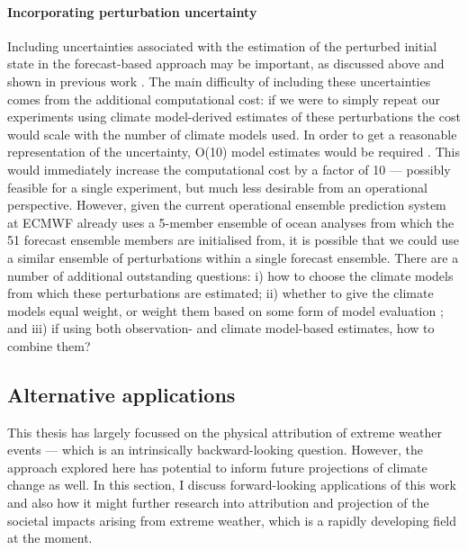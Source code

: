     \paragraph*{Incorporating perturbation uncertainty}

      Including uncertainties associated with the estimation of the perturbed initial state in the forecast-based approach may be important, as discussed above and shown in previous work \citep{pall_anthropogenic_2011,sparrow_attributing_2018}. The main difficulty of including these uncertainties comes from the additional computational cost: if we were to simply repeat our experiments using climate model-derived estimates of these perturbations the cost would scale with the number of climate models used. In order to get a reasonable representation of the uncertainty, O(10) model estimates would be required \citep[as in][]{sparrow_attributing_2018}. This would immediately increase the computational cost by a factor of 10 --- possibly feasible for a single experiment, but much less desirable from an operational perspective. However, given the current operational ensemble prediction system at ECMWF already uses a 5-member ensemble of ocean analyses from which the 51 forecast ensemble members are initialised from, it is possible that we could use a similar ensemble of perturbations within a single forecast ensemble. There are a number of additional outstanding questions: i) how to choose the climate models from which these perturbations are estimated; ii) whether to give the climate models equal weight, or weight them based on some form of model evaluation \citep[this is especially relevant for the latest generation of climate models, the CMIP6 ensemble,][]{eyring_overview_2016,hausfather_climate_2022}; and iii) if using both observation- and climate model-based estimates, how to combine them?

  \subsection{Alternative applications}

    This thesis has largely focussed on the physical attribution of extreme weather events --- which is an intrinsically backward-looking question. However, the approach explored here has potential to inform future projections of climate change as well. In this section, I discuss forward-looking applications of this work and also how it might further research into attribution and projection of the societal impacts arising from extreme weather, which is a rapidly developing field at the moment.

